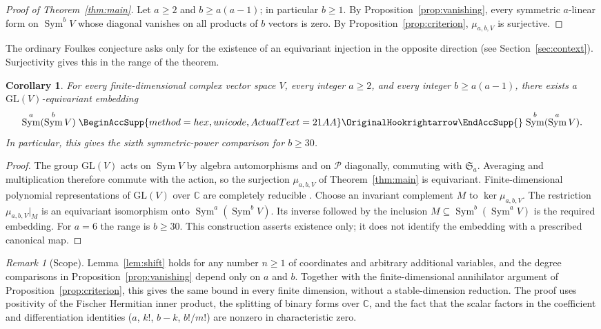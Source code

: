 \documentclass[11pt]{article}
\renewcommand{\hookrightarrow}{\mathrel{
  \BeginAccSupp{method=hex,unicode,ActualText=21AA}
  \OriginalHookrightarrow\EndAccSupp{}}}
\newtheorem{corollary}[theorem]{Corollary}
\theoremstyle{definition}
\theoremstyle{remark}
\newtheorem{remark}[theorem]{Remark}
\DeclareMathOperator{\Sym}{Sym}
\newcommand{\C}{\mathbb C}
\newcommand{\Sa}{\mathfrak S_a}
\newcommand{\cP}{\mathcal P}
\begin{document}
\begin{proof}[Proof of Theorem~\ref{thm:main}]
Let $a\ge2$ and $b\ge a(a-1)$; in particular $b\ge1$. By
Proposition~\ref{prop:vanishing}, every symmetric $a$-linear form on
$\Sym^bV$ whose diagonal vanishes on all products of $b$ vectors is zero. By
Proposition~\ref{prop:criterion}, $\mu_{a,b,V}$ is surjective.
\end{proof}

The ordinary Foulkes conjecture asks only for the existence of an
equivariant injection in the opposite direction (see
Section~\ref{sec:context}). Surjectivity gives this in the range of the
theorem.

\begin{corollary}\label{cor:comparison}
For every finite-dimensional complex vector space $V$, every integer
$a\ge2$, and every integer $b\ge a(a-1)$, there exists a
$\mathrm{GL}(V)$-equivariant embedding
\[
 \Sym^a(\Sym^b V)\hookrightarrow\Sym^b(\Sym^a V).
\]
In particular, this gives the sixth symmetric-power comparison for $b\ge30$.
\end{corollary}

\begin{proof}
The group $\mathrm{GL}(V)$ acts on $\Sym V$ by algebra automorphisms and on
$\cP$ diagonally, commuting with $\Sa$. Averaging and multiplication
therefore commute with the action, so the surjection $\mu_{a,b,V}$ of
Theorem~\ref{thm:main} is equivariant. Finite-dimensional polynomial
representations of $\mathrm{GL}(V)$ over $\C$ are completely reducible
\cite[Chapter~I, Appendix~A, Sections~7--8]{Macdonald}. Choose an invariant
complement $M$ to $\ker\mu_{a,b,V}$. The restriction $\mu_{a,b,V}|_M$ is an
equivariant isomorphism onto $\Sym^a(\Sym^b V)$. Its inverse followed by the
inclusion $M\subseteq\Sym^b(\Sym^a V)$ is the required embedding. For
$a=6$ the range is $b\ge30$. This construction asserts existence only; it
does not identify the embedding with a prescribed canonical map.
\end{proof}

\begin{remark}[Scope]
Lemma~\ref{lem:shift} holds for any number $n\ge1$ of coordinates and
arbitrary additional variables, and the degree comparisons in
Proposition~\ref{prop:vanishing} depend only on $a$ and $b$. Together with
the finite-dimensional annihilator argument of
Proposition~\ref{prop:criterion}, this gives the same bound in every finite
dimension, without a stable-dimension reduction. The proof uses positivity
of the Fischer Hermitian inner product, the splitting of binary forms over
$\C$, and the fact that the scalar factors in the coefficient and
differentiation identities ($a$, $k!$, $b-k$, $b!/m!$) are nonzero in
characteristic zero.
\end{remark}
\end{document}

